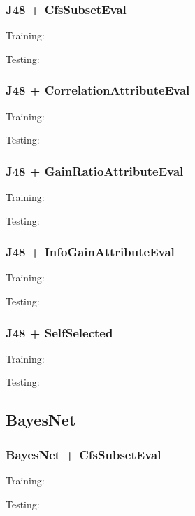 \documentclass{article}
\begin{document}
\subsubsection{J48 + CfsSubsetEval}\label{app:J48 + CfsSubsetEval weka outputs}
Training:

Testing:


\subsubsection{J48 + CorrelationAttributeEval}\label{app:J48 + CorrelationAttributeEval weka outputs}
Training:

Testing:


\subsubsection{J48 + GainRatioAttributeEval}\label{app:J48 + GainRatioAttributeEval weka outputs}
Training:

Testing:


\subsubsection{J48 + InfoGainAttributeEval}\label{app:J48 + InfoGainAttributeEval weka outputs}
Training:

Testing:


\subsubsection{J48 + SelfSelected}\label{app:J48 + SelfSelected weka outputs}
Training:

Testing:


\subsection{BayesNet}

\subsubsection{BayesNet + CfsSubsetEval}\label{app:BayesNet + CfsSubsetEval weka outputs}
Training:

Testing:

\end{document}
